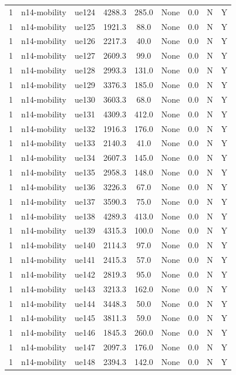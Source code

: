 \begin{table}[ht]
\begin{tabular}{|c|c|c|c|c|c|c|c|c|}
1 & n14-mobility & ue124 & 4288.3 & 285.0 & None & 0.0 & N & Y \\
1 & n14-mobility & ue125 & 1921.3 & 88.0 & None & 0.0 & N & Y \\
1 & n14-mobility & ue126 & 2217.3 & 40.0 & None & 0.0 & N & Y \\
1 & n14-mobility & ue127 & 2609.3 & 99.0 & None & 0.0 & N & Y \\
1 & n14-mobility & ue128 & 2993.3 & 131.0 & None & 0.0 & N & Y \\
1 & n14-mobility & ue129 & 3376.3 & 185.0 & None & 0.0 & N & Y \\
1 & n14-mobility & ue130 & 3603.3 & 68.0 & None & 0.0 & N & Y \\
1 & n14-mobility & ue131 & 4309.3 & 412.0 & None & 0.0 & N & Y \\
1 & n14-mobility & ue132 & 1916.3 & 176.0 & None & 0.0 & N & Y \\
1 & n14-mobility & ue133 & 2140.3 & 41.0 & None & 0.0 & N & Y \\
1 & n14-mobility & ue134 & 2607.3 & 145.0 & None & 0.0 & N & Y \\
1 & n14-mobility & ue135 & 2958.3 & 148.0 & None & 0.0 & N & Y \\
1 & n14-mobility & ue136 & 3226.3 & 67.0 & None & 0.0 & N & Y \\
1 & n14-mobility & ue137 & 3590.3 & 75.0 & None & 0.0 & N & Y \\
1 & n14-mobility & ue138 & 4289.3 & 413.0 & None & 0.0 & N & Y \\
1 & n14-mobility & ue139 & 4315.3 & 100.0 & None & 0.0 & N & Y \\
1 & n14-mobility & ue140 & 2114.3 & 97.0 & None & 0.0 & N & Y \\
1 & n14-mobility & ue141 & 2415.3 & 57.0 & None & 0.0 & N & Y \\
1 & n14-mobility & ue142 & 2819.3 & 95.0 & None & 0.0 & N & Y \\
1 & n14-mobility & ue143 & 3213.3 & 162.0 & None & 0.0 & N & Y \\
1 & n14-mobility & ue144 & 3448.3 & 50.0 & None & 0.0 & N & Y \\
1 & n14-mobility & ue145 & 3811.3 & 59.0 & None & 0.0 & N & Y \\
1 & n14-mobility & ue146 & 1845.3 & 260.0 & None & 0.0 & N & Y \\
1 & n14-mobility & ue147 & 2097.3 & 176.0 & None & 0.0 & N & Y \\
1 & n14-mobility & ue148 & 2394.3 & 142.0 & None & 0.0 & N & Y \\

\end{tabular}
\end{table}
